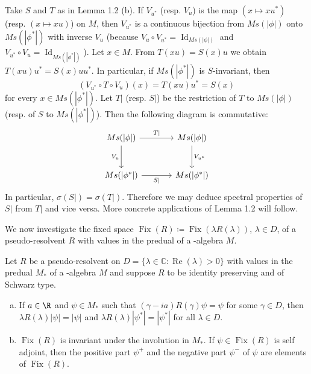 \begin{remark}\label{rem:1.3}
Take $S$ and $T$ as in Lemma 1.2 (b).
If $V_{u^{*}}$ (resp. $V_u$) is the map $(x \mapsto xu^{*})$ (resp. $(x \mapsto xu)$) on $M$, then $V_{u^{*}}$ is a continuous bijection from $Ms(|\phi|)$ onto $Ms(|\phi^{*}|)$ with inverse $V_u$ (because $V_u \circ V_{u^{*}} = \operatorname{Id}_{Ms(|\phi|)}$ and $V_{u^{*}} \circ V_u = \operatorname{Id}_{Ms(|\phi^{*}|)}$).
Let $x \in M$.
From $T(xu) = S(x)u$ we obtain $T(xu)u^{*} = S(x)uu^{*}$.
In particular, if $Ms(|\phi^{*}|)$ is $S$-invariant, then
\[
(V_{u^{*}} \circ T \circ V_u)(x) = T(xu)u^{*} = S(x)
\]
for every $x \in Ms(|\phi^{*}|)$.
Let $T|$ (resp. $S|$) be the restriction of $T$ to $Ms(|\phi|)$ (resp. of $S$ to $Ms(|\phi^{*}|)$).
Then the following diagram is commutative:
\begin{equation*}
\begin{tikzcd}[column sep=large, row sep=large, scale=1.5]
Ms(|\phi|) \arrow[r, "T|"] \arrow[d, "V_u"'] & Ms(|\phi|) \arrow[d, "V_{u^{*}}"] \\
Ms(|\phi^{*}|) \arrow[r, "S|"'] & Ms(|\phi^{*}|)
\end{tikzcd}
\end{equation*}
In particular, $\sigma(S|) = \sigma(T|)$.
Therefore we may deduce spectral properties of $S|$ from $T|$ and vice versa.
More concrete applications of Lemma 1.2 will follow.
\end{remark}
We now investigate the fixed space $\operatorname{Fix}(R) \coloneqq \operatorname{Fix}(\lambda R(\lambda))$, $\lambda \in D$, of a pseudo-resolvent $R$ with values in the predual of a \WA-algebra $M$.

\begin{proposition}\label{prop:d3-1.4}
Let $R$ be a pseudo-resolvent on $D = \{\lambda \in \mathbb{C}: \operatorname{Re}(\lambda) > 0\}$ with values in the predual $M_*$ of a \WA-algebra $M$ and suppose $R$ to be identity preserving and of Schwarz type.

\begin{enumerate}[(a)]
\item 
If $a \in \R$ and $\psi \in M_*$ such that $(\gamma - ia)R(\gamma)\psi = \psi$ for some $\gamma \in D$, then $\lambda R(\lambda)|\psi| = |\psi|$ and $\lambda R(\lambda)|\psi^{*}| = |\psi^{*}|$ for all $\lambda \in D$.

\item 
$\operatorname{Fix}(R)$ is invariant under the involution in $M_*$.
If $\psi \in \operatorname{Fix}(R)$ is self adjoint, then the positive part $\psi^+$ and the negative part $\psi^-$ of $\psi$ are elements of $\operatorname{Fix}(R)$.
\end{enumerate}
\end{proposition}


